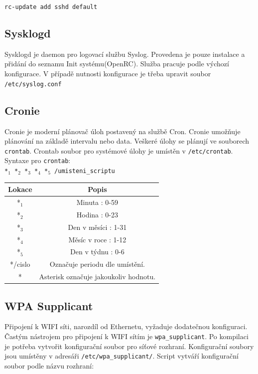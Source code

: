 \documentclass[12pt,a4paper,twoside,]{article}
\begin{document}
{{{{{{\texttt{rc-update add sshd default}
\subsection{\textsf{Sysklogd}} 
Sysklogd je daemon pro logovací službu Syslog. Provedena je pouze instalace a přidání do seznamu Init systému(OpenRC). Služba pracuje podle výchozí konfigurace. V případě nutnosti konfigurace je třeba upravit soubor \texttt{/etc/syslog.conf}

\subsection{\textsf{Cronie}}

Cronie je moderní plánovač úloh postavený na službě Cron. Cronie umožňuje plánování na základě intervalu nebo data. Veškeré úlohy se plánují ve souborech \texttt{crontab}. Crontab soubor pro systémové úlohy je umístěn v \texttt{/etc/crontab}. Syntaxe pro \texttt{crontab}:\\

\texttt{*$_{1}$ *$_{2}$ *$_{3}$ *$_{4}$ *$_{5}$ /umisteni\_scriptu}

\begin{table}[h]
	\centering
	\begin{tabular}{|c|c|}
		\hline 
		Lokace&Popis \\
		\hline
		*$_{1}$&  Minuta : 0-59 \\
		\hline
		*$_{2}$&  Hodina : 0-23 \\
		\hline
		*$_{3}$&  Den v měsíci : 1-31 \\
		\hline
		*$_{4}$&  Měsíc v roce : 1-12 \\
		\hline
		*$_{5}$&  Den v týdnu : 0-6 \\
		\hline
		*/cislo&  Označuje periodu dle umístění. \\
		\hline
		*&  Asterisk označuje jakoukoliv hodnotu. \\
		\hline
	\end{tabular}

\end{table}
\subsection{\textsf{WPA Supplicant}}
Připojení k WIFI síti, narozdíl od Ethernetu, vyžaduje dodatečnou konfiguraci. Častým nástrojem pro připojení k WIFI sítím je \texttt{wpa\_supplicant}. Po kompilaci je potřeba vytvořit konfigurační soubor pro síťové rozhraní. Konfigurační soubory jsou umístěny v adresáři \texttt{/etc/wpa\_supplicant/}. Script vytváří konfigurační soubor podle názvu rozhraní:\\

}}}}}}
\end{document}
